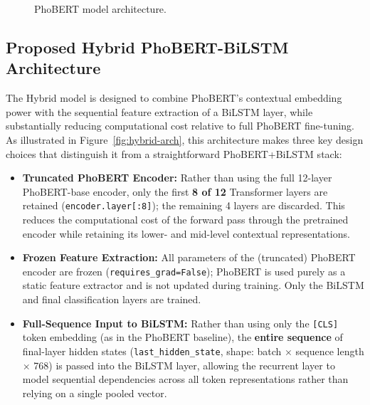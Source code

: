 \documentclass[12pt]{report} %
\begin{document}
\begin{figure}[H]
    \centering
    \caption{PhoBERT model architecture.}
    \label{fig:phobert-arch}
\end{figure}

\subsection{Proposed Hybrid PhoBERT-BiLSTM Architecture}

The Hybrid model is designed to combine PhoBERT's contextual embedding power with the sequential feature extraction of a BiLSTM layer, while substantially reducing computational cost relative to full PhoBERT fine-tuning. As illustrated in Figure~\ref{fig:hybrid-arch}, this architecture makes three key design choices that distinguish it from a straightforward PhoBERT+BiLSTM stack:

\begin{itemize}
    \item \textbf{Truncated PhoBERT Encoder:} Rather than using the full 12-layer PhoBERT-base encoder, only the first \textbf{8 of 12} Transformer layers are retained (\texttt{encoder.layer[:8]}); the remaining 4 layers are discarded. This reduces the computational cost of the forward pass through the pretrained encoder while retaining its lower- and mid-level contextual representations.
    \item \textbf{Frozen Feature Extraction:} All parameters of the (truncated) PhoBERT encoder are frozen (\texttt{requires\_grad=False}); PhoBERT is used purely as a static feature extractor and is not updated during training. Only the BiLSTM and final classification layers are trained.
    \item \textbf{Full-Sequence Input to BiLSTM:} Rather than using only the \texttt{[CLS]} token embedding (as in the PhoBERT baseline), the \textbf{entire sequence} of final-layer hidden states (\texttt{last\_hidden\_state}, shape: batch $\times$ sequence length $\times$ 768) is passed into the BiLSTM layer, allowing the recurrent layer to model sequential dependencies across all token representations rather than relying on a single pooled vector.
\end{itemize}
\end{document}
